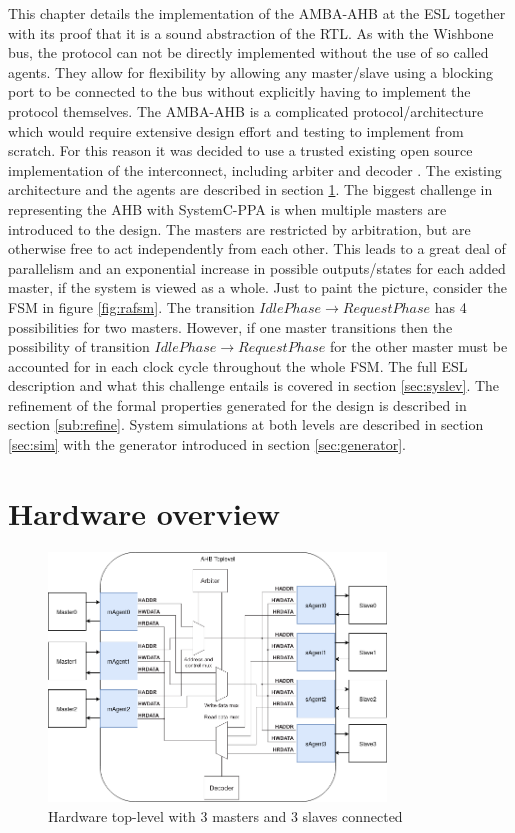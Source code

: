 \label{ch:impl}
This chapter details the implementation of the AMBA-AHB at the ESL together with its proof that it is a sound abstraction of the RTL. As with the Wishbone bus, the protocol can not be directly implemented without the use of so called agents. They allow for flexibility by allowing any master/slave using a blocking port to be connected to the bus without explicitly having to implement the protocol themselves. The AMBA-AHB is a complicated protocol/architecture which would require extensive design effort and testing to implement from scratch. For this reason it was decided to use a trusted existing open source implementation of the interconnect, including arbiter and decoder \cite{ahbsys}. The existing architecture and the agents are described in section \ref{sec:hardover}. The biggest challenge in representing the AHB with SystemC-PPA is when multiple masters are introduced to the design. The masters are restricted by arbitration, but are otherwise free to act independently from each other. This leads to a great deal of parallelism and an exponential increase in possible outputs/states for each added master, if the system is viewed as a whole. Just to paint the picture, consider the FSM in figure \ref{fig:rafsm}. The transition $Idle Phase\rightarrow Request Phase$ has 4 possibilities for two masters. However, if one master transitions then the possibility of transition $Idle Phase\rightarrow Request Phase$ for the other master must be accounted for in each clock cycle throughout the whole FSM. The full ESL description and what this challenge entails is covered in section \ref{sec:syslev}. The refinement of the formal properties generated for the design is described in section \ref{sub:refine}. System simulations at both levels are described in section \ref{sec:sim} with the generator introduced in section \ref{sec:generator}.

\newpage
\section{Hardware overview}
\label{sec:hardover}
\begin{figure}[hbt]
    \begin{center}
        \includegraphics[width=0.8\textwidth]{figs/hw/Hw_toplevel.png}
    \end{center}
    \caption{Hardware top-level with 3 masters and 3 slaves connected}
    \label{fig:hw_toplev}
\end{figure}

